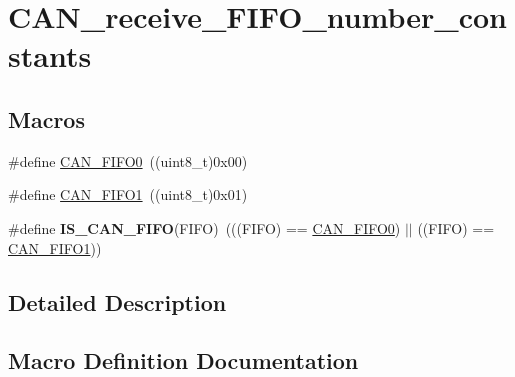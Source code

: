 \hypertarget{group___c_a_n__receive___f_i_f_o__number__constants}{}\section{C\+A\+N\+\_\+receive\+\_\+\+F\+I\+F\+O\+\_\+number\+\_\+constants}
\label{group___c_a_n__receive___f_i_f_o__number__constants}
\subsection*{Macros}
\begin{DoxyCompactItemize}
\item 
\#define \hyperlink{group___c_a_n__receive___f_i_f_o__number__constants_ga8f52eeefb86b2af5b7c3b4b75fa4d114}{C\+A\+N\+\_\+\+F\+I\+F\+O0}~((uint8\+\_\+t)0x00)
\item 
\#define \hyperlink{group___c_a_n__receive___f_i_f_o__number__constants_gafbcf3f13dbf61030ab7a812595ba9850}{C\+A\+N\+\_\+\+F\+I\+F\+O1}~((uint8\+\_\+t)0x01)
\item 
\hypertarget{group___c_a_n__receive___f_i_f_o__number__constants_gaeeb94bf58bd48b8928f964eaaa20a24a}{}\#define {\bfseries I\+S\+\_\+\+C\+A\+N\+\_\+\+F\+I\+F\+O}(F\+I\+F\+O)~(((F\+I\+F\+O) == \hyperlink{group___c_a_n__receive___f_i_f_o__number__constants_ga8f52eeefb86b2af5b7c3b4b75fa4d114}{C\+A\+N\+\_\+\+F\+I\+F\+O0}) $\vert$$\vert$ ((F\+I\+F\+O) == \hyperlink{group___c_a_n__receive___f_i_f_o__number__constants_gafbcf3f13dbf61030ab7a812595ba9850}{C\+A\+N\+\_\+\+F\+I\+F\+O1}))\label{group___c_a_n__receive___f_i_f_o__number__constants_gaeeb94bf58bd48b8928f964eaaa20a24a}

\end{DoxyCompactItemize}


\subsection{Detailed Description}


\subsection{Macro Definition Documentation}
\hypertarget{group___c_a_n__receive___f_i_f_o__number__constants_ga8f52eeefb86b2af5b7c3b4b75fa4d114}{}
